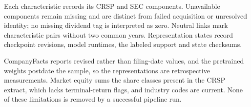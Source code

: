 \documentclass[11pt]{article}
\begin{document}
Each characteristic records its CRSP and SEC components. Unavailable components
remain missing and are distinct from failed acquisition or unresolved
identity; no
missing dividend tag is interpreted as zero. Neutral links mark characteristic
pairs without two common years. Representation states record
checkpoint revisions,
model runtimes, the labeled support and state checksums.

CompanyFacts reports revised rather than filing-date values, and the pretrained
weights postdate the sample, so the representations are retrospective
measurements. Market equity sums the share classes present in the CRSP extract,
which lacks terminal-return flags, and industry codes are current. None of these
limitations is removed by a successful pipeline run.



\end{document}
